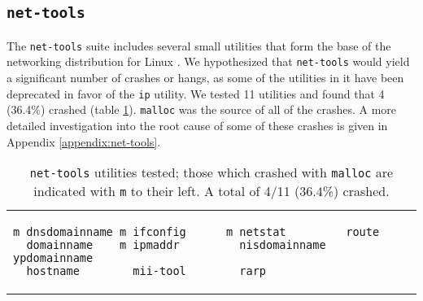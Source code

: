 \subsection{\texttt{net-tools}}
The \texttt{net-tools} suite includes several small utilities that form the base of the networking distribution for Linux \cite{nettools}. We hypothesized that \texttt{net-tools} would yield a significant number of crashes or hangs, as some of the utilities in it have been deprecated in favor of the \texttt{ip} utility. We tested 11 utilities and found that 4 (36.4\%) crashed (table \ref{lst:net-tools}). \texttt{malloc} was the source of all of the crashes. A more detailed investigation into the root cause of some of these crashes is given in Appendix \ref{appendix:net-tools}.

\begin{table}[h]
\begin{tabular}{l}
\begin{lstlisting}
m dnsdomainname m ifconfig      m netstat         route
  domainname    m ipmaddr         nisdomainname   ypdomainname
  hostname        mii-tool        rarp
\end{lstlisting}
\end{tabular}
\caption{\texttt{net-tools} utilities tested; those which crashed with \texttt{malloc} are indicated with \texttt{m} to their left. A total of 4/11 (36.4\%) crashed.}
\label{lst:net-tools}
\end{table}